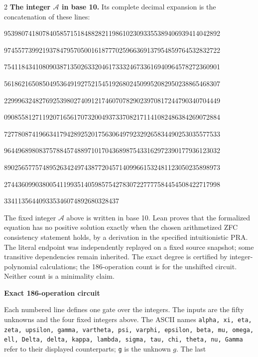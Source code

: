 \documentclass[10pt]{article}
\begin{document}
\begin{multicols}{2}
\textbf{The integer $\mathcal A$ in base 10.}
Its complete decimal expansion is the concatenation of these lines:\par
\begingroup\fontsize{7.7}{8.2}\selectfont{}\par
95398074180784058571518488282119861023093355389406939414042892\par
97455773992193784795705001618777025966369137954859764532832722\par
75411843410809038713502633204617333246733616940964578272360901\par
56186216508504953649192752154519268024509952082950238865468307\par
22999632482769253980274091217460707829023970817244790340704449\par
09085581271192071656170732004937337082171141082486384269072884\par
72778087419663417942892520175630649792329265834490253035577533\par
96449689808375788457488971017043689875433162972390177936123032\par
89025657757489526342497438772045714099661532481123050235898973\par
27443609903800541199351405985754278307227777584454508422717998\par
334113564409335346074892680328437\par
\endgroup
\normalfont\fontsize{7.7}{8.2}\selectfont
The fixed integer $\mathcal A$ above is written in base 10. Lean proves that the formalized equation has no positive solution exactly
when the chosen arithmetized ZFC consistency statement holds, by a derivation
in the specified intuitionistic PRA. The literal endpoint was independently
replayed on a fixed source snapshot; some transitive dependencies remain
inherited. The exact degree is certified by integer-polynomial calculations;
the 186-operation count is for the unshifted circuit. Neither count is a
minimality claim.
\end{multicols}
\clearpage
\begin{center}{\large\bfseries Exact 186-operation circuit}\end{center}
Each numbered line defines one gate over the integers. The inputs are the
fifty unknowns and the four fixed integers above. The ASCII names
\texttt{alpha, xi, eta, zeta, upsilon, gamma, vartheta, psi, varphi, epsilon, beta, mu, omega, ell, Delta, delta, kappa, lambda, sigma, tau, chi, theta, nu, Gamma}
refer to their displayed counterparts; \texttt{g} is the unknown $g$. The last
\end{document}
